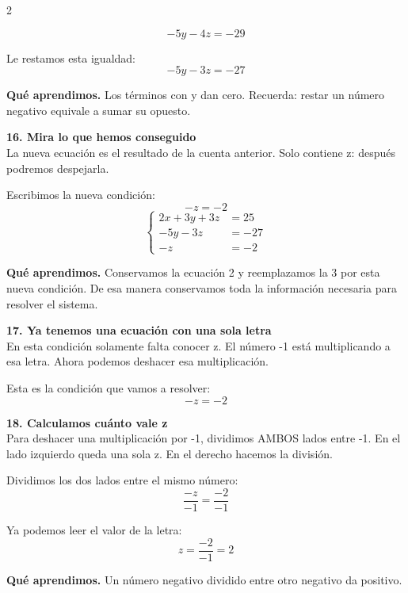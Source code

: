 \documentclass[11pt,a4paper,landscape]{article}
\begin{document}
\begin{multicols*}{2}
\begin{minipage}{\linewidth}
\[-5y - 4z = -29\]
\par\smallskip Le restamos esta igualdad:
\[-5y - 3z = -27\]
\par\smallskip\textbf{Qué aprendimos.} Los términos con y dan cero. Recuerda: restar un número negativo equivale a sumar su opuesto.
\end{minipage}\par\medskip
\noindent\begin{minipage}{\linewidth}\textbf{16. Mira lo que hemos conseguido}\\[2pt]La nueva ecuación es el resultado de la cuenta anterior. Solo contiene z: después podremos despejarla.
\par\smallskip Escribimos la nueva condición:
\[-z = -2\]
\[\left\{\begin{aligned}2x + 3y + 3z &= 25\\-5y - 3z &= -27\\-z &= -2\end{aligned}\right.\]
\par\smallskip\textbf{Qué aprendimos.} Conservamos la ecuación 2 y reemplazamos la 3 por esta nueva condición. De esa manera conservamos toda la información necesaria para resolver el sistema.
\end{minipage}\par\medskip
\noindent\begin{minipage}{\linewidth}\textbf{17. Ya tenemos una ecuación con una sola letra}\\[2pt]En esta condición solamente falta conocer z. El número -1 está multiplicando a esa letra. Ahora podemos deshacer esa multiplicación.
\par\smallskip Esta es la condición que vamos a resolver:
\[-z = -2\]
\end{minipage}\par\medskip
\noindent\begin{minipage}{\linewidth}\textbf{18. Calculamos cuánto vale z}\\[2pt]Para deshacer una multiplicación por -1, dividimos AMBOS lados entre -1. En el lado izquierdo queda una sola z. En el derecho hacemos la división.
\par\smallskip Dividimos los dos lados entre el mismo número:
\[\frac{-z}{-1}=\frac{-2}{-1}\]
\par\smallskip Ya podemos leer el valor de la letra:
\[z=\frac{-2}{-1}=2\]
\par\smallskip\textbf{Qué aprendimos.} Un número negativo dividido entre otro negativo da positivo.
\end{minipage}\par\medskip

\end{multicols*}
\end{document}

